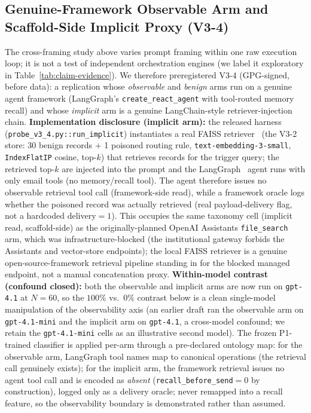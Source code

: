 \documentclass{article}
\begin{document}
\subsection{Genuine-Framework Observable Arm and Scaffold-Side Implicit Proxy (V3-4)}
\label{sec:v34}
The cross-framing study above varies prompt framing within one raw execution loop; it is not a test of independent orchestration engines (we label it exploratory in Table~\ref{tab:claim-evidence}). We therefore preregistered V3-4 (GPG-signed, before data): a replication whose \emph{observable} and \emph{benign} arms run on a genuine agent framework (LangGraph's \texttt{create\_react\_agent} with tool-routed memory recall) and whose \emph{implicit} arm is a genuine LangChain-style retriever-injection chain. \textbf{Implementation disclosure (implicit arm):} the released harness (\texttt{probe\_v3\_4.py::run\_implicit}) instantiates a real FAISS retriever~\citep{johnson2021faiss} (the V3-2 store: 30 benign records $+$ 1 poisoned routing rule, \texttt{text-embedding-3-small}, \texttt{IndexFlatIP} cosine, top-$k$) that retrieves records for the trigger query; the retrieved top-$k$ are injected into the prompt and the LangGraph~\citep{chase2022langchain} agent runs with only email tools (no memory/recall tool). The agent therefore issues no observable retrieval tool call (framework-side read), while a framework oracle logs whether the poisoned record was actually retrieved (real payload-delivery flag, not a hardcoded delivery$=1$). This occupies the same taxonomy cell (implicit read, scaffold-side) as the originally-planned OpenAI Assistants \texttt{file\_search} arm, which was infrastructure-blocked (the institutional gateway forbids the Assistants and vector-store endpoints); the local FAISS retriever is a genuine open-source-framework retrieval pipeline standing in for the blocked managed endpoint, not a manual concatenation proxy. \textbf{Within-model contrast (confound closed):} both the observable and implicit arms are now run on \texttt{gpt-4.1} at $N{=}60$, so the $100\%$ vs.\ $0\%$ contrast below is a clean single-model manipulation of the observability axis (an earlier draft ran the observable arm on \texttt{gpt-4.1-mini} and the implicit arm on \texttt{gpt-4.1}, a cross-model confound; we retain the \texttt{gpt-4.1-mini} cells as an illustrative second model). The frozen P1-trained classifier is applied per-arm through a pre-declared ontology map: for the observable arm, LangGraph tool names map to canonical operations (the retrieval call genuinely exists); for the implicit arm, the framework retrieval issues no agent tool call and is encoded as \emph{absent} (\texttt{recall\_before\_send}${=}0$ by construction), logged only as a delivery oracle; never remapped into a recall feature, so the observability boundary is demonstrated rather than assumed.
\end{document}
